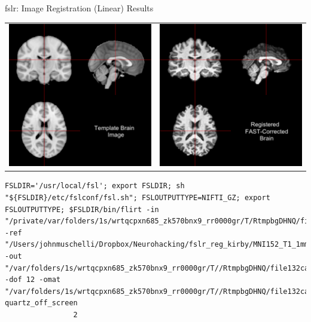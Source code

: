 \documentclass[11pt]{beamer}\usepackage[]{graphicx}\usepackage[]{color}
\makeatletter
\newenvironment{kframe}{%
 \def\at@end@of@kframe{}%
 \ifinner\ifhmode%
  \def\at@end@of@kframe{\end{minipage}}%
  \begin{minipage}{\columnwidth}%
 \fi\fi%
 \def\FrameCommand##1{\hskip\@totalleftmargin \hskip-\fboxsep
 \colorbox{shadecolor}{##1}\hskip-\fboxsep
     \hskip-\linewidth \hskip-\@totalleftmargin \hskip\columnwidth}%
 \MakeFramed {\advance\hsize-\width
   \@totalleftmargin\z@ \linewidth\hsize
   \@setminipage}}%
 {\par\unskip\endMakeFramed%
 \at@end@of@kframe}
\newenvironment{knitrout}{}{} %
\makeatother
\begin{document}
\begin{frame}[fragile]{fslr: Image Registration (Linear) Results}

\begin{tabular}{cc}
\includegraphics[width=0.5\linewidth]{Template_Brain.png} & \includegraphics[width=0.5\linewidth]{FLIRT_Reg_Image_Brain.png}
\end{tabular}

\end{frame}

\begin{knitrout}
\color{fgcolor}\begin{kframe}
\begin{verbatim}
FSLDIR='/usr/local/fsl'; export FSLDIR; sh "${FSLDIR}/etc/fslconf/fsl.sh"; FSLOUTPUTTYPE=NIFTI_GZ; export FSLOUTPUTTYPE; $FSLDIR/bin/flirt -in "/private/var/folders/1s/wrtqcpxn685_zk570bnx9_rr0000gr/T/RtmpbgDHNQ/file132ca7bf4c24b.nii.gz" -ref "/Users/johnmuschelli/Dropbox/Neurohacking/fslr_reg_kirby/MNI152_T1_1mm_brain.nii.gz" -out "/var/folders/1s/wrtqcpxn685_zk570bnx9_rr0000gr/T//RtmpbgDHNQ/file132ca4f49e377" -dof 12 -omat "/var/folders/1s/wrtqcpxn685_zk570bnx9_rr0000gr/T//RtmpbgDHNQ/file132ca2000981.mat"  
quartz_off_screen 
                2 
\end{verbatim}
\end{kframe}
\end{knitrout}
\end{document}
